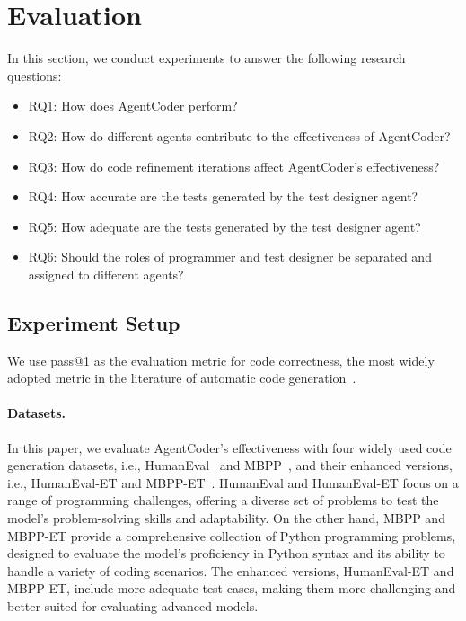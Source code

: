 \documentclass[manuscript,screen,review]{acmart}
\newcommand{\xxx}{AgentCoder\xspace}
\begin{document}

\section{Evaluation}
In this section, we conduct experiments to answer the following research questions:
\begin{itemize}
    \item RQ1: How does \xxx perform?
    \item RQ2: How do different agents contribute to the effectiveness of \xxx?
    \item RQ3: How do code refinement iterations affect \xxx's effectiveness?
    \item RQ4: How accurate are the tests generated by the test designer agent?
    \item RQ5: How adequate are the tests generated by the test designer agent?
    \item RQ6: Should the roles of programmer and test designer be separated and assigned to different agents?
\end{itemize}



\subsection{Experiment Setup}
\label{sec:experimentalsetup}
We use pass@1 as the evaluation metric for code correctness, the most widely adopted metric in the literature of automatic code generation~\cite{Austin2021ProgramSW,Chen2021EvaluatingLL,Dong2023CodeScoreEC,Zhang2023SelfEditFC,Dong2023SelfcollaborationCG}.
\paragraph{Datasets.} In this paper, we evaluate \xxx's effectiveness with four widely used code generation datasets, i.e., HumanEval~\cite{chen2021evaluating} and MBPP~\cite{Austin2021ProgramSW}, and their enhanced versions, i.e., HumanEval-ET and MBPP-ET~\cite{Dong2023CodeScoreEC}. HumanEval and HumanEval-ET focus on a range of programming challenges, offering a diverse set of problems to test the model's problem-solving skills and adaptability. On the other hand, MBPP and MBPP-ET provide a comprehensive collection of Python programming problems, designed to evaluate the model's proficiency in Python syntax and its ability to handle a variety of coding scenarios. The enhanced versions, HumanEval-ET and MBPP-ET, include more adequate test cases, making them more challenging and better suited for evaluating advanced models.
\end{document}
